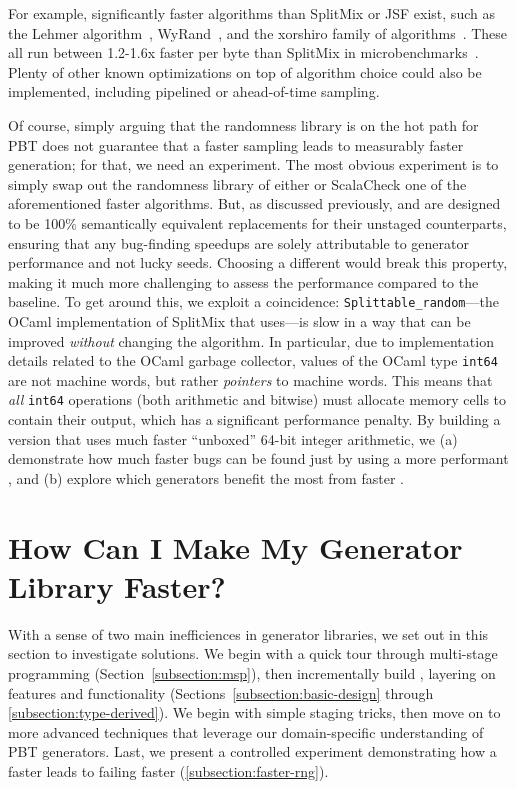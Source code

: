 \documentclass[acmsmall]{acmart}
\theoremstyle{definition}
\begin{document}
For example, significantly faster algorithms than SplitMix or JSF exist,
such as the Lehmer algorithm~\cite{lehmerrng}, WyRand~\cite{wyrand}, and the xorshiro family of algorithms~\cite{xorshiro}.
These all run between 1.2-1.6x faster per byte than SplitMix in microbenchmarks~\cite{lemiremicrobenchmarks}.
Plenty of other known optimizations on top of algorithm choice could also be implemented,
including pipelined or ahead-of-time sampling.

Of course, simply arguing that the randomness library is on the hot
path for PBT does not guarantee that a faster sampling leads to measurably faster
generation; for that, we need an experiment. The most obvious experiment is to
simply swap out the randomness library of either \bq{} or ScalaCheck one of the aforementioned faster algorithms.
But, as discussed previously, \camlname{} and \scalaname{} are designed to be 100\% semantically equivalent replacements for
their unstaged counterparts, ensuring that any bug-finding speedups are solely attributable to generator performance and not lucky seeds.
Choosing a different \rand{} would break this property, making it much more challenging to assess the performance compared to the baseline.
To get around this, we exploit a coincidence:
\texttt{Splittable\_random}---the OCaml implementation of SplitMix that \bq{} uses---is slow in a way that
can be improved \emph{without} changing the algorithm.
In particular,
due to implementation details related to the OCaml garbage collector,
values of the OCaml type \texttt{int64} are not machine words, but rather
\emph{pointers} to machine words. This means
that \emph{all} \texttt{int64} operations (both arithmetic and bitwise) must
allocate memory cells to contain their output, which has a significant performance penalty.
By building a version that uses much faster ``unboxed'' 64-bit integer
arithmetic, we (a) demonstrate how much faster bugs can be found just by
using a more performant \rand{}, and (b) explore which generators benefit the most from faster \rands{}.

\section{How Can I Make My Generator Library Faster?}
\label{section:faster-generators}

With a sense of two main inefficiences in generator libraries, we set out in this section to investigate solutions.
We begin with a quick tour through multi-stage programming (Section~\ref{subsection:msp}),
then incrementally build \camlname, layering on features and
functionality  (Sections~\ref{subsection:basic-design} through \ref{subsection:type-derived}).
We begin with simple staging tricks, then move on to more advanced techniques that
leverage our domain-specific understanding of PBT generators.
Last, we present a controlled experiment demonstrating how a
faster \rand{} leads to failing faster  (\ref{subsection:faster-rng}).
\end{document}
